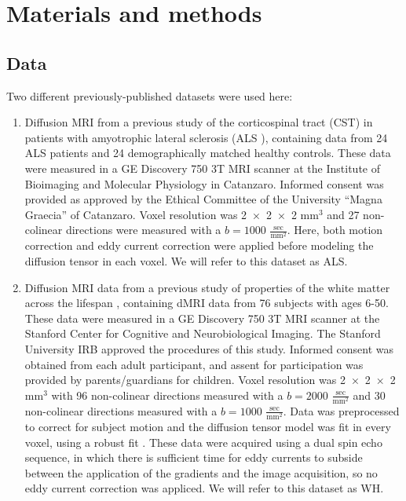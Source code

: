 \section*{Materials and methods}

\subsection*{Data}

Two different previously-published datasets were used here:

\begin{enumerate}

\item Diffusion MRI from a previous study of the corticospinal
tract (CST) in patients with amyotrophic lateral sclerosis
(ALS \cite{sarica2017corticospinal}), containing data from 24 ALS
patients and 24 demographically matched healthy controls. These data
were measured in a GE Discovery 750 3T MRI scanner at the Institute
of Bioimaging and Molecular Physiology in Catanzaro. Informed consent
was provided as approved by the Ethical Committee of the University
``Magna Graecia'' of Catanzaro. Voxel resolution was \num{2x2x2}
$\text{mm}^3$ and 27 non-colinear directions were measured with a
$b=1000$ $\frac{\text{sec}}{\text{mm}^2}$. Here, both motion correction
and eddy current correction were applied before modeling the diffusion
tensor in each voxel. We will refer to this dataset as ALS.

\item Diffusion MRI data from a previous study of properties of
the white matter across the lifespan \cite{yeatman2014lifespan},
containing dMRI data from 76 subjects with ages 6-50. These data were
measured in a GE Discovery 750 3T MRI scanner at the Stanford Center
for Cognitive and Neurobiological Imaging. The Stanford University
IRB approved the procedures of this study. Informed consent was
obtained from each adult participant, and assent for participation
was provided by parents/guardians for children. Voxel resolution was
\num{2x2x2}$\text{mm}^3$ with 96 non-colinear directions measured with a
$b=2000$ $\frac{\text{sec}}{\text{mm}^2}$ and 30 non-colinear directions
measured with a $b=1000$ $\frac{\text{sec}}{\text{mm}^2}$. Data was
preprocessed to correct for subject motion and the diffusion tensor
model \cite{basser1994mr} was fit in every voxel, using a robust fit
\cite{chang2005restore}. These data were acquired using a dual spin echo
sequence, in which there is sufficient time for eddy currents to subside
between the application of the gradients and the image acquisition, so
no eddy current correction was appliced. We will refer to this dataset
as WH.

\end{enumerate}

